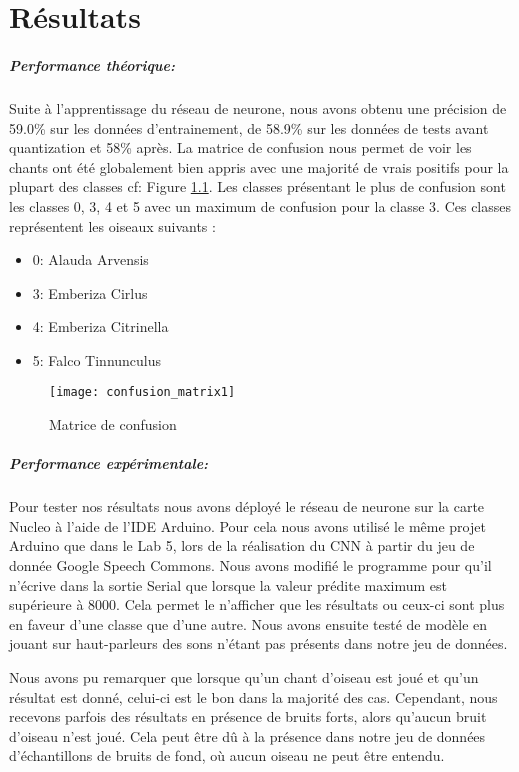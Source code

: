 \chapter{Résultats}


\paragraph{Performance théorique:} Suite à l'apprentissage du réseau de neurone, nous avons obtenu une précision de 59.0\% sur les données d'entrainement,
de 58.9\% sur les données de tests avant quantization et 58\% après.
La matrice de confusion nous permet de voir les chants ont été globalement 
bien appris avec une majorité de vrais positifs pour la plupart des classes cf: Figure \ref{graph:confusion_matrix1}.
Les classes présentant le plus de confusion sont les classes 0, 3, 4 et 5 avec un maximum de confusion pour la classe 3.
Ces classes représentent les oiseaux suivants :

\begin{itemize}
  \item 0: Alauda Arvensis
  \item 3: Emberiza Cirlus
  \item 4: Emberiza Citrinella
  \item 5: Falco Tinnunculus
\end{itemize}

\begin{figure}[!ht]
  \texttt{[image: confusion\_matrix1]}
  \centering
  \caption{Matrice de confusion}
  \label{graph:confusion_matrix1}
\end{figure}

\paragraph{Performance expérimentale:} Pour tester nos résultats nous avons déployé le réseau de neurone sur la carte Nucleo à l'aide 
de l'IDE Arduino. Pour cela nous avons utilisé le même projet Arduino que dans le Lab 5, lors de la réalisation du CNN à partir du
jeu de donnée Google Speech Commons. Nous avons modifié le programme pour qu'il n'écrive dans la sortie Serial que lorsque la valeur prédite maximum
est supérieure à 8000. Cela permet le n'afficher que les résultats ou ceux-ci sont plus en faveur d'une classe que d'une autre.
Nous avons ensuite testé de modèle en jouant sur haut-parleurs des sons n'étant pas présents dans notre jeu de données.

Nous avons pu remarquer que lorsque qu'un chant d'oiseau est joué et qu'un résultat est donné, celui-ci est le bon dans la majorité des cas.
Cependant, nous recevons parfois des résultats en présence de bruits forts, alors qu'aucun bruit d'oiseau n'est joué. 
Cela peut être dû à la présence dans notre jeu de données d'échantillons de bruits de fond, où aucun oiseau ne peut être entendu.

